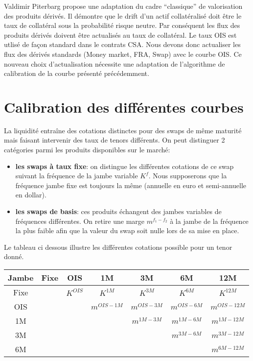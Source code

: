 \documentclass{article}
\begin{document}
Valdimir Piterbarg propose une adaptation du cadre “classique” de valorisation des produits dérivés. Il démontre que le drift d’un actif collatéralisé doit être le taux de collatéral sous la probabilité risque neutre. Par conséquent les flux des produits dérivés doivent être actualisés au taux de collatéral. Le taux OIS est utlisé de façon standard dans le contrats CSA. Nous devons donc actualiser les flux des dérivés standards (Money market, FRA, Swap) avec le courbe OIS. Ce nouveau choix d'actualisation nécessite une adaptation de l'algorithme de calibration de la courbe présenté précédemment.\\

\section*{Calibration des différentes courbes}

La liquidité entraîne des cotations distinctes pour des swaps de même maturité mais faisant intervenir des taux de tenors différents. On peut distinguer 2 catégories parmi les produits disponibles sur le marché:\\
\begin{itemize}
\item \textbf{les swaps à taux fixe}: on distingue les différentes cotations de ce swap suivant la fréquence de la jambe variable $K^f$. Nous supposerons que la fréquence jambe fixe est toujours la même (annuelle en euro et semi-annuelle en dollar).\\

\item \textbf{les swaps de basis}: ces produits échangent des jambes variables de fréquences différentes. On retire une marge $m^{f_1-f_2}$ à la jambe de la fréquence la plus faible afin que la valeur du swap soit nulle lors de sa mise en place.\\ 

\end{itemize}

Le tableau ci dessous illustre les différentes cotations possible pour un tenor donné.

\begin{center}
\begin{tabular}{|c|c|c|c|c|c|c|}
\hline
Jambe&Fixe&OIS&1M&3M&6M&12M\\
\hline
Fixe&&$K^{OIS}$&$K^{1M}$&$K^{3M}$&$K^{6M}$&$K^{12M}$\\
OIS&&&$m^{OIS-1M}$&$m^{OIS-3M}$&$m^{OIS-6M}$&$m^{OIS-12M}$\\
1M&&&&$m^{1M-3M}$&$m^{1M-6M}$&$m^{1M-12M}$\\
3M&&&&&$m^{3M-6M}$&$m^{3M-12M}$\\
6M&&&&&&$m^{6M-12M}$\\
\hline
\end{tabular}
\end{center}
\end{document}
